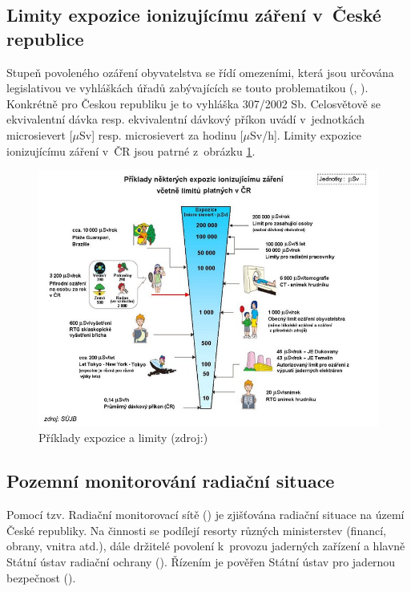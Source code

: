 \subsection{Limity expozice ionizujícímu záření v~České republice}
\label{sub:limity}
Stupeň povoleného ozáření obyvatelstva se řídí omezeními, která jsou určována legislativou ve vyhláškách úřadů zabývajících se touto problematikou (, ). Konkrétně pro Českou republiku je to vyhláška  307/2002 Sb. Celosvětově se ekvivalentní dávka resp. ekvivalentní dávkový příkon uvádí v~jednotkách microsievert [$\mu$Sv] resp. microsievert za hodinu [$\mu$Sv/h]. Limity expozice ionizujícímu záření v~ČR jsou patrné z~obrázku \ref{fig:davkyCR}. \cite{suroPriRadOch} 

\begin{figure}[H]
    \centering
    \includegraphics[scale=0.6]{./pictures/davkyCR.jpeg}
      	\caption[Příklady expozice a limity]{Příklady expozice a limity (zdroj:\cite{suroOcek})}
    	\label{fig:davkyCR}
\end{figure} 

\subsection{Pozemní monitorování radiační situace}
Pomocí tzv. Radiační monitorovací sítě () je zjišťována radiační situace na území České republiky. Na činnosti  se podílejí resorty různých ministerstev (financí, obrany, vnitra atd.), dále držitelé povolení k~provozu jaderných zařízení a hlavně Státní ústav radiační ochrany (). Řízením je pověřen Státní ústav pro jadernou bezpečnost (). \cite{suroRMS}

